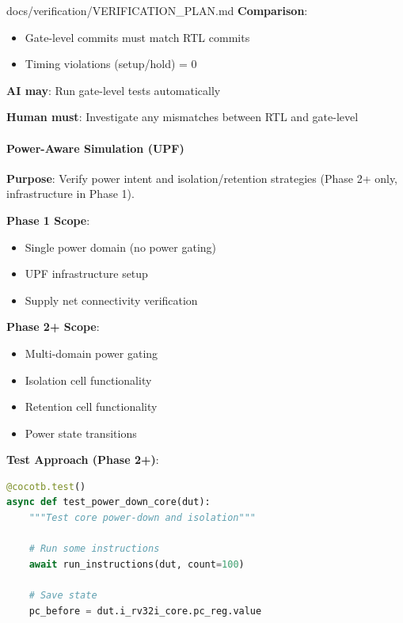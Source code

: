 \begin{relocated}{docs/verification/VERIFICATION_PLAN.md}
\textbf{Comparison}:

\begin{itemize}
\tightlist
\item
  Gate-level commits must match RTL commits
\item
  Timing violations (setup/\allowbreak{}hold) = 0
\end{itemize}

\textbf{AI may}: Run gate-level tests automatically

\textbf{Human must}: Investigate any mismatches between RTL and
gate-level

\paragraph{Power-Aware Simulation (UPF)}\label{ds:ch:verification-plan:8-power-aware-simulation-upf}

\textbf{Purpose}: Verify power intent and
isolation/\allowbreak{}retention strategies (Phase 2+ only,
infrastructure in Phase 1).

\textbf{Phase 1 Scope}:

\begin{itemize}
\tightlist
\item
  Single power domain (no power gating)
\item
  UPF infrastructure setup
\item
  Supply net connectivity verification
\end{itemize}

\textbf{Phase 2+ Scope}:

\begin{itemize}
\tightlist
\item
  Multi-domain power gating
\item
  Isolation cell functionality
\item
  Retention cell functionality
\item
  Power state transitions
\end{itemize}

\textbf{Test Approach (Phase 2+)}:

\begin{lstlisting}[language=Python]
@cocotb.test()
async def test_power_down_core(dut):
    """Test core power-down and isolation"""

    # Run some instructions
    await run_instructions(dut, count=100)

    # Save state
    pc_before = dut.i_rv32i_core.pc_reg.value


\end{lstlisting}
\end{relocated}
